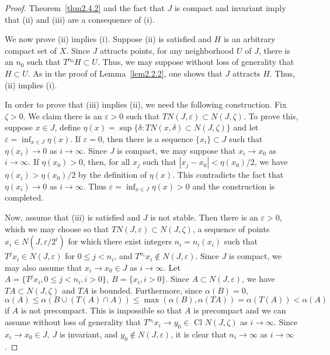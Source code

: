 \documentclass{surv-l}
\theoremstyle{plain}
\theoremstyle{definition}
\numberwithin{equation}{section}
\numberwithin{figure}{chapter}
\begin{document}
\begin{proof} Theorem~\ref{thm2.4.2} and the fact that $J$ is compact and invariant imply that (ii) and (iii) are a consequence of (i).

We now prove (ii) implies (i). Suppose (ii) is satisfied and $H$ is an arbitrary compact set of $X$. Since $J$ attracts points, for any neighborhood $U$ of $J$, there is an $n_{0}$ such that $T^{n_{0}}H\subset U$. Thus, we may suppose without loss of generality that $H\subset U$. As in the proof of Lemma~\ref{lem2.2.2}, one shows that $J$ attracts $H$. Thus, (ii) implies (i).

In order to prove that (iii) implies (ii), we need the following construction. Fix $\zeta>0$. We claim there is an $\varepsilon >0$ such that $TN(J, \varepsilon)\subset N(J, \zeta)$. To prove this, suppose $x\in J$, define $\eta(x)=\sup\{\delta\!:TN(x, \delta)\subset N(J, \zeta)\}$ and let $\varepsilon=\inf_{x\in J}\eta(x)$. If $\varepsilon=0$, then there is a sequence $\{x_{i}\}\subset J$ such that $\eta(x_{i})\rightarrow 0$ as $i\rightarrow\infty$. Since $J$ is compact, we may suppose that $x_{i}\rightarrow x_{0}$ as $ i\rightarrow\infty$. If $\eta(x_{0})>0$, then, for all $x_{j}$ such that $|x_{j}-x_{0}|<\eta(x_{0})/2$, we have $\eta(x_{i})>\eta(x_{0})/2$ by the definition of $\eta(x)$. This contradicts the fact that $\eta(x_{i})\rightarrow 0$ as $i\rightarrow\infty$. Thus $\varepsilon =\inf_{x\in J}\eta(x)>0$ and the construction is completed.

Now, assume that (iii) is satisfied and $J$ is not stable. Then there is an $\varepsilon >0$, which we may choose so that $TN(J, \varepsilon)\subset N(J, \zeta)$, a sequence of points $x_{i}\in N(J, \varepsilon/2^{i})$ for which there exist integers $n_{i}=n_{i}(x_{i})$ such that $T^{j}x_{i}\in N(J, \varepsilon)$ for $0\leq j<n_{i}$, and $T^{n_{i}}x_{i}\not\in N(J, \varepsilon)$. Since $J$ is compact, we may also assume that $x_{i}\rightarrow x_{0}\in J$ as $i\rightarrow\infty$. Let $A=\{T^{j}x_{i}, 0\leq j<n_{i}, i>0\},\ B=\{x_{i}, i>0\}$. Since $A\subset N(J, \varepsilon)$, we have $TA\subset N(J, \zeta)$ and $TA$ is bounded. Furthermore, since $\alpha(B)=0$,
\begin{equation*}
\alpha(A)\leq\alpha(B\cup(T(A)\cap A))\leq\max(\alpha(B), \alpha(TA))=\alpha(T(A))<\alpha(A)
\end{equation*}
if $A$ is not precompact. This is impossible so that $A$ is precompact and we can assume without loss of generality that $T^{n_{i}}x_{i}\rightarrow y_{0}\in$ Cl $N(J, \zeta)$ as $i\rightarrow\infty$. Since $x_{i}\rightarrow x_{0}\in J,\ J$ is invariant, and $y_{0}\not\in N(J, \varepsilon)$, it is clear that $n_{i}\rightarrow\infty$ as $i\rightarrow\infty$.


\end{proof}
\end{document}
